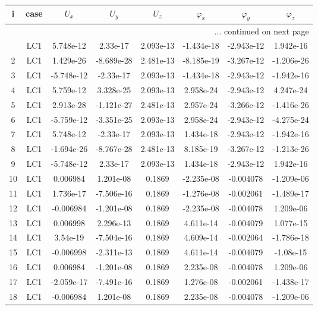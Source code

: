 \documentclass{article}%
\begin{document}
\begin{longtable}{| c c | c c c c c c |}%
\hline%
i&case&$U_x$&$U_y$&$U_z$&$\varphi_x$&$\varphi_y$&$\varphi_z$\\%
\hline%
\endhead%
\hline%
\multicolumn{8}{r}{... continued on next page}\\%
\endfoot%
\hline%
\endlastfoot%
1&LC1&5.748e{-}12&2.33e{-}17&2.093e{-}13&{-}1.434e{-}18&{-}2.943e{-}12&1.942e{-}16\\%
2&LC1&1.429e{-}26&{-}8.689e{-}28&2.481e{-}13&{-}8.185e{-}19&{-}3.267e{-}12&{-}1.206e{-}26\\%
3&LC1&{-}5.748e{-}12&{-}2.33e{-}17&2.093e{-}13&{-}1.434e{-}18&{-}2.943e{-}12&{-}1.942e{-}16\\%
4&LC1&5.759e{-}12&3.328e{-}25&2.093e{-}13&2.958e{-}24&{-}2.943e{-}12&4.247e{-}24\\%
5&LC1&2.913e{-}28&{-}1.121e{-}27&2.481e{-}13&2.957e{-}24&{-}3.266e{-}12&{-}1.416e{-}26\\%
6&LC1&{-}5.759e{-}12&{-}3.351e{-}25&2.093e{-}13&2.958e{-}24&{-}2.943e{-}12&{-}4.275e{-}24\\%
7&LC1&5.748e{-}12&{-}2.33e{-}17&2.093e{-}13&1.434e{-}18&{-}2.943e{-}12&{-}1.942e{-}16\\%
8&LC1&{-}1.694e{-}26&{-}8.767e{-}28&2.481e{-}13&8.185e{-}19&{-}3.267e{-}12&{-}1.213e{-}26\\%
9&LC1&{-}5.748e{-}12&2.33e{-}17&2.093e{-}13&1.434e{-}18&{-}2.943e{-}12&1.942e{-}16\\%
10&LC1&0.006984&1.201e{-}08&0.1869&{-}2.235e{-}08&{-}0.004078&{-}1.209e{-}06\\%
11&LC1&1.736e{-}17&{-}7.506e{-}16&0.1869&{-}1.276e{-}08&{-}0.002061&{-}1.489e{-}17\\%
12&LC1&{-}0.006984&{-}1.201e{-}08&0.1869&{-}2.235e{-}08&{-}0.004078&1.209e{-}06\\%
13&LC1&0.006998&2.296e{-}13&0.1869&4.611e{-}14&{-}0.004079&1.077e{-}15\\%
14&LC1&3.54e{-}19&{-}7.504e{-}16&0.1869&4.609e{-}14&{-}0.002064&{-}1.786e{-}18\\%
15&LC1&{-}0.006998&{-}2.311e{-}13&0.1869&4.611e{-}14&{-}0.004079&{-}1.08e{-}15\\%
16&LC1&0.006984&{-}1.201e{-}08&0.1869&2.235e{-}08&{-}0.004078&1.209e{-}06\\%
17&LC1&{-}2.059e{-}17&{-}7.491e{-}16&0.1869&1.276e{-}08&{-}0.002061&{-}1.438e{-}17\\%
18&LC1&{-}0.006984&1.201e{-}08&0.1869&2.235e{-}08&{-}0.004078&{-}1.209e{-}06\\%

\end{longtable}
\end{document}
